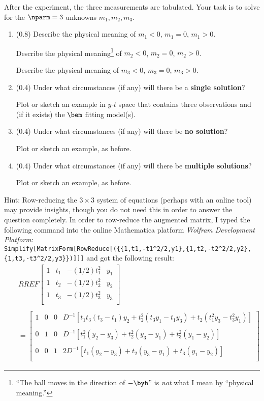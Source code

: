 \documentclass[11pt,titlepage,fleqn]{article}
\begin{document}
%
After the experiment, the three measurements are tabulated.
Your task is to solve for the $\nparm=3$ unknowns $m_1, m_2, m_3$.
%
\begin{enumerate}
\item (0.8) Describe the physical meaning of $m_1 < 0$, $m_1 = 0$, $m_1 > 0$.

Describe the physical meaning\footnote{``The ball moves in the direction of $-\byh$'' is {\em not} what I mean by ``physical meaning.''} of $m_2 < 0$, $m_2 = 0$, $m_2 > 0$.

Describe the physical meaning of $m_3 < 0$, $m_3 = 0$, $m_3 > 0$.

\item (0.4) Under what circumstances (if any) will there be a {\bf single solution}?

Plot or sketch an example in $y$-$t$ space that contains three observations and (if it exists) the $\bem$ fitting model(s).

\item (0.4) Under what circumstances (if any) will there be {\bf no solution}?

Plot or sketch an example, as before.

\item (0.4) Under what circumstances (if any) will there be {\bf multiple solutions}?

Plot or sketch an example, as before.
\end{enumerate}
%
Hint: Row-reducing the $3 \times 3$ system of equations (perhaps with an online tool) may provide insights, though you do not need this in order to answer the question completely. 
In order to row-reduce the augmented matrix, I typed the following command into the online Mathematica platform {\em Wolfram Development Platform}: \\
\verb+Simplify[MatrixForm[RowReduce[({{1,t1,-t1^2/2,y1},{1,t2,-t2^2/2,y2},{1,t3,-t3^2/2,y3}})]]]+
and got the following result:
%
\begin{eqnarray}
&& RREF \left[
\begin{array}{cccc}
1 & t_1 & -(1/2)t_1^2 & y_1 \\
1 & t_2 & -(1/2)t_2^2 & y_2 \\
1 & t_3 & -(1/2)t_3^2 & y_3 \\
\end{array}
\right]
\nonumber \\ \nonumber \\
&& =
\left[
\begin{array}{cccc}
1 & 0 & 0 & D^{-1}\left[t_1 t_3(t_3-t_1)y_2 + t_2^2(t_3 y_1 - t_1 y_3) + t_2(t_1^2 y_3 - t_3^2 y_1) \right] \\
& & & \\
0 & 1 & 0 & D^{-1}\left[ t_1^2(y_2-y_3) + t_2^2(y_3 -y_1) + t_3^2(y_1-y_2)\right] \\
& & & \\
0 & 0 & 1 & 2D^{-1}\left[ t_1(y_2-y_3) + t_2(y_3 -y_1) + t_3(y_1-y_2)\right] \\
\end{array}
\right]
\label{rref}
\end{eqnarray}
\end{document}
